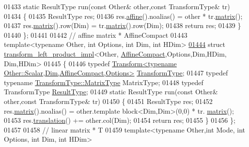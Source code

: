 \begin{DoxyCode}
01433   \textcolor{keyword}{static} ResultType run(\textcolor{keyword}{const} Other& other,\textcolor{keyword}{const} TransformType& tr)
01434   \{
01435     ResultType res;
01436     res.\hyperlink{group___geometry___module_a88c996ca4cccf46ab4d520b7d99c332b}{affine}().noalias() = other * tr.\hyperlink{group___geometry___module_aec8168000a88a807130d41020af98d47}{matrix}();
01437     res.\hyperlink{group___geometry___module_aec8168000a88a807130d41020af98d47}{matrix}().row(Dim) = tr.\hyperlink{group___geometry___module_aec8168000a88a807130d41020af98d47}{matrix}().row(Dim);
01438     \textcolor{keywordflow}{return} res;
01439   \}
01440 \};
01441 
01442 \textcolor{comment}{// affine matrix * AffineCompact}
01443 \textcolor{keyword}{template}<\textcolor{keyword}{typename} Other, \textcolor{keywordtype}{int} Options, \textcolor{keywordtype}{int} Dim, \textcolor{keywordtype}{int} HDim>
\hyperlink{struct_eigen_1_1internal_1_1transform__left__product__impl_3_01_other_00_01_affine_compact_00_015e9b9427c7ea1ff34d05c5964520dbab}{01444} \textcolor{keyword}{struct }\hyperlink{struct_eigen_1_1internal_1_1transform__left__product__impl}{transform\_left\_product\_impl}<Other,
      \hyperlink{group__enums_ggaee59a86102f150923b0cac6d4ff05107aa30a06b60d218b709020972df47de2b0}{AffineCompact},Options,Dim,HDim, Dim,HDim>
01445 \{
01446   \textcolor{keyword}{typedef} \hyperlink{group___geometry___module_class_eigen_1_1_transform}{Transform<typename Other::Scalar,Dim,AffineCompact,Options>}
       \hyperlink{group___geometry___module_class_eigen_1_1_transform}{TransformType};
01447   \textcolor{keyword}{typedef} \textcolor{keyword}{typename} \hyperlink{group___core___module_class_eigen_1_1_matrix}{TransformType::MatrixType} MatrixType;
01448   \textcolor{keyword}{typedef} TransformType \hyperlink{group___geometry___module_class_eigen_1_1_transform}{ResultType};
01449   \textcolor{keyword}{static} ResultType run(\textcolor{keyword}{const} Other& other,\textcolor{keyword}{const} TransformType& tr)
01450   \{
01451     ResultType res;
01452     res.\hyperlink{group___geometry___module_aec8168000a88a807130d41020af98d47}{matrix}().noalias() = other.template block<Dim,Dim>(0,0) * tr.
      \hyperlink{group___geometry___module_aec8168000a88a807130d41020af98d47}{matrix}();
01453     res.\hyperlink{group___geometry___module_afa93ba97d26912bb3d8777cbed102045}{translation}() += other.col(Dim);
01454     \textcolor{keywordflow}{return} res;
01455   \}
01456 \};
01457 
01458 \textcolor{comment}{// linear matrix * T}
01459 \textcolor{keyword}{template}<\textcolor{keyword}{typename} Other,\textcolor{keywordtype}{int} Mode, \textcolor{keywordtype}{int} Options, \textcolor{keywordtype}{int} Dim, \textcolor{keywordtype}{int} HDim>

\end{DoxyCode}
